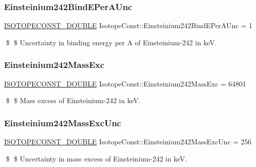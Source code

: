 \subsubsection{\texorpdfstring{Einsteinium242\+Bind\+E\+Per\+A\+Unc}{Einsteinium242BindEPerAUnc}}
{\footnotesize\ttfamily \mbox{\hyperlink{group___isotope_const-_macros_ga8f45a7272ce02c0b4c65c44636ed719a}{I\+S\+O\+T\+O\+P\+E\+C\+O\+N\+S\+T\+\_\+\+D\+O\+U\+B\+LE}} Isotope\+Const\+::\+Einsteinium242\+Bind\+E\+Per\+A\+Unc = 1}

\$ \$ Uncertainty in binding energy per A of Einsteinium-\/242 in keV. \mbox{\label{group___isotope_const-_einsteinium-_es242_ga441d42ac57d52132384f527e079fa85f}} 
\subsubsection{\texorpdfstring{Einsteinium242\+Mass\+Exc}{Einsteinium242MassExc}}
{\footnotesize\ttfamily \mbox{\hyperlink{group___isotope_const-_macros_ga8f45a7272ce02c0b4c65c44636ed719a}{I\+S\+O\+T\+O\+P\+E\+C\+O\+N\+S\+T\+\_\+\+D\+O\+U\+B\+LE}} Isotope\+Const\+::\+Einsteinium242\+Mass\+Exc = 64801}

\$ \$ Mass excess of Einsteinium-\/242 in keV. \mbox{\label{group___isotope_const-_einsteinium-_es242_ga40de71e84e6bd7e1aebe13b4f4b0b7ca}} 
\subsubsection{\texorpdfstring{Einsteinium242\+Mass\+Exc\+Unc}{Einsteinium242MassExcUnc}}
{\footnotesize\ttfamily \mbox{\hyperlink{group___isotope_const-_macros_ga8f45a7272ce02c0b4c65c44636ed719a}{I\+S\+O\+T\+O\+P\+E\+C\+O\+N\+S\+T\+\_\+\+D\+O\+U\+B\+LE}} Isotope\+Const\+::\+Einsteinium242\+Mass\+Exc\+Unc = 256}

\$ \$ Uncertainty in mass excess of Einsteinium-\/242 in keV. \mbox{\label{group___isotope_const-_einsteinium-_es242_ga6ff66dd17c04a742ef5f61203dbf0477}} 
